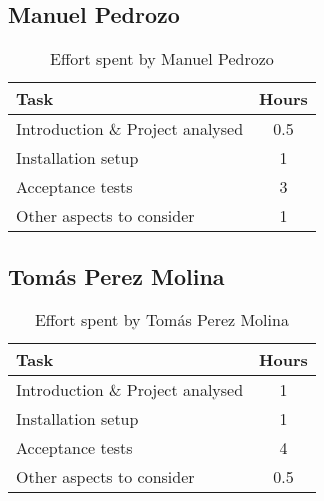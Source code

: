 \subsection{Manuel Pedrozo}

\begin{table}[H]
    \centering
    \begin{tabular}{|p{7cm}|c|}
    \hline
    \textbf{Task} & \textbf{Hours} \\ \hline
    Introduction \& Project analysed & 0.5 \\ \hline
    Installation setup & 1 \\ \hline
    Acceptance tests & 3 \\ \hline
    Other aspects to consider & 1 \\ \hline
    \end{tabular}
    \caption{\label{tbl:manuel-effort} Effort spent by Manuel Pedrozo}
    \end{table}

\subsection{Tomás Perez Molina}
\begin{table}[H]
    \centering
    \begin{tabular}{|p{7cm}|c|}
    \hline
    \textbf{Task} & \textbf{Hours} \\ \hline
    Introduction \& Project analysed & 1 \\ \hline
    Installation setup & 1 \\ \hline
    Acceptance tests & 4 \\ \hline
    Other aspects to consider & 0.5 \\ \hline
    \end{tabular}
    \caption{\label{tbl:tomas-effort} Effort spent by Tomás Perez Molina}
    \end{table}
